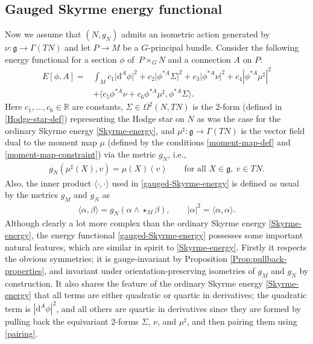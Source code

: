 \documentclass[10pt,a4paper]{amsart}
\newcommand{\g}{{\mathfrak{g}}}
\newcommand{\R}{{\mathbb{R}}}
\newcommand{\1}{{\mathbb{1}}}
\def \d{\mathrm{d}}
\newcommand{\ip}[1]{\langle#1\rangle}
\numberwithin{equation}{section}
\begin{document}
\subsection{Gauged Skyrme energy functional}\label{sec:energy-gauged}
Now we assume that $(N,g_N)$ admits an isometric action generated by $\nu\colon \g\to \Gamma(TN)$ and let $P\to M$ be a $G$-principal bundle. Consider the following energy functional for a section $\phi$ of~$P\times_GN$ and a connection $A$ on $P$:
\begin{align} E[\phi,A]=&\int_Mc_1\bigl|\d^A\phi\bigr|^2+c_2\bigl|\phi^{\ast A}\Sigma\bigr|^2+c_3\bigl|\phi^{\ast A}\nu\bigr|^2+c_4|\phi^{\ast A}\mu^\sharp|^2\nonumber\\
&+\bigl\langle c_5\phi^{\ast A}\nu+c_6\phi^{\ast A}\mu^\sharp,\phi^{\ast A}\Sigma\bigr\rangle.\label{gauged-Skyrme-energy}
\end{align}
Here $c_1,\dots,c_6\in\R$ are constants, $\Sigma\in\Omega^2(N,TN)$ is the $2$-form (defined in \eqref{Hodge-star-def}) representing the Hodge star on $N$ as was the case for the ordinary Skyrme energy \eqref{Skyrme-energy}, and $\mu^\sharp\colon \g\to\Gamma(TN)$ is the vector field dual to the moment map $\mu$ (defined by the conditions \eqref{moment-map-def} and \eqref{moment-map-constraint}) via the metric $g_N$, i.e.,
\begin{align*}
 g_N(\mu^\sharp(X),v)=\mu(X)(v)\qquad\text{for all }X\in\g,\ v\in TN.
\end{align*}
Also, the inner product $\ip{\cdot,\cdot}$ used in \eqref{gauged-Skyrme-energy} is defined as usual by the metrics $g_M$ and $g_N$ as
\begin{align}
 \ip{\alpha,\beta}=g_N(\alpha\wedge\star_{M}\beta),\qquad|\alpha|^2=\ip{\alpha,\alpha}.\label{pairing}
\end{align}
Although clearly a lot more complex than the ordinary Skyrme energy \eqref{Skyrme-energy}, the energy functional \eqref{gauged-Skyrme-energy} possesses some important natural features, which are similar in spirit to \eqref{Skyrme-energy}. Firstly it respects the obvious symmetries; it is gauge-invariant by Proposition \ref{Prop:pullback-properties}, and invariant under orientation-preserving isometries of $g_M$ and $g_N$ by construction. It also shares the feature of the ordinary Skyrme energy \eqref{Skyrme-energy} that all terms are either quadratic or quartic in derivatives; the quadratic term is $|\d^A\phi|^2$, and all others are quartic in derivatives since they are formed by pulling back the equivariant $2$-forms $\Sigma$, $\nu$, and $\mu^\sharp$, and then pairing them using \eqref{pairing}.
\end{document}
